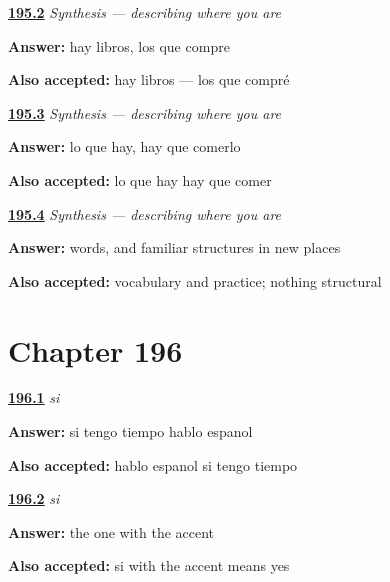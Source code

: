 \noindent\begin{minipage}[t]{\linewidth}
\raggedright
\hyperlink{review-ES-C54-sintesis-lo-que-hay-pick}{\textbf{195.2}} \emph{Synthesis — describing where you are}\par
\small \textbf{Answer:} hay libros, los que compre\par
\footnotesize \textbf{Also accepted:} hay libros — los que compré
\end{minipage}\par\medskip

\noindent\begin{minipage}[t]{\linewidth}
\raggedright
\hyperlink{review-ES-C54-sintesis-lo-que-hay-must}{\textbf{195.3}} \emph{Synthesis — describing where you are}\par
\small \textbf{Answer:} lo que hay, hay que comerlo\par
\footnotesize \textbf{Also accepted:} lo que hay hay que comer
\end{minipage}\par\medskip

\noindent\begin{minipage}[t]{\linewidth}
\raggedright
\hyperlink{review-ES-C54-sintesis-lo-que-hay-done}{\textbf{195.4}} \emph{Synthesis — describing where you are}\par
\small \textbf{Answer:} words, and familiar structures in new places\par
\footnotesize \textbf{Also accepted:} vocabulary and practice; nothing structural
\end{minipage}\par\medskip

\section*{Chapter 196}

\noindent\begin{minipage}[t]{\linewidth}
\raggedright
\hyperlink{review-ES-C55-si-say}{\textbf{196.1}} \emph{si}\par
\small \textbf{Answer:} si tengo tiempo hablo espanol\par
\footnotesize \textbf{Also accepted:} hablo espanol si tengo tiempo
\end{minipage}\par\medskip

\noindent\begin{minipage}[t]{\linewidth}
\raggedright
\hyperlink{review-ES-C55-si-accent}{\textbf{196.2}} \emph{si}\par
\small \textbf{Answer:} the one with the accent\par
\footnotesize \textbf{Also accepted:} si with the accent means yes
\end{minipage}\par\medskip

